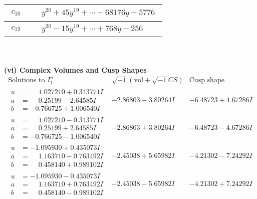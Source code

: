 \documentclass[1p]{elsarticle_modified}
\theoremstyle{definition}
\newcommand{\I}{\sqrt{-1}}
\begin{document}
\begin{tabular}{m{50pt}|m{274pt}}
\hline $$\begin{aligned}c_{10}\end{aligned}$$&$\begin{aligned}
&y^{20}+45 y^{19}+\cdots-68176 y+5776
\end{aligned}$\\
\hline $$\begin{aligned}c_{12}\end{aligned}$$&$\begin{aligned}
&y^{20}-15 y^{19}+\cdots+768 y+256
\end{aligned}$\\
\hline
\end{tabular}\\~\\
\newpage\flushleft \textbf{(vi) Complex Volumes and Cusp Shapes}
$$\begin{array}{c|c|c}  
\text{Solutions to }I^u_{1}& \I (\text{vol} + \sqrt{-1}CS) & \text{Cusp shape}\\
 \hline 
\begin{aligned}
u &= \phantom{-}1.027210 + 0.343771 I \\
a &= \phantom{-}0.25199 - 2.64585 I \\
b &= -0.766725 + 1.006540 I\end{aligned}
 & -2.86803 - 3.80264 I & -6.48723 + 4.67286 I \\ \hline\begin{aligned}
u &= \phantom{-}1.027210 - 0.343771 I \\
a &= \phantom{-}0.25199 + 2.64585 I \\
b &= -0.766725 - 1.006540 I\end{aligned}
 & -2.86803 + 3.80264 I & -6.48723 - 4.67286 I \\ \hline\begin{aligned}
u &= -1.095930 + 0.435073 I \\
a &= \phantom{-}1.163710 - 0.763492 I \\
b &= \phantom{-}0.458140 + 0.989102 I\end{aligned}
 & -2.45038 + 5.65982 I & -4.21302 - 7.24292 I \\ \hline\begin{aligned}
u &= -1.095930 - 0.435073 I \\
a &= \phantom{-}1.163710 + 0.763492 I \\
b &= \phantom{-}0.458140 - 0.989102 I\end{aligned}
 & -2.45038 - 5.65982 I & -4.21302 + 7.24292 I \\ \hline\begin{aligned}

\end{aligned}
\end{array}$$
\end{document}
